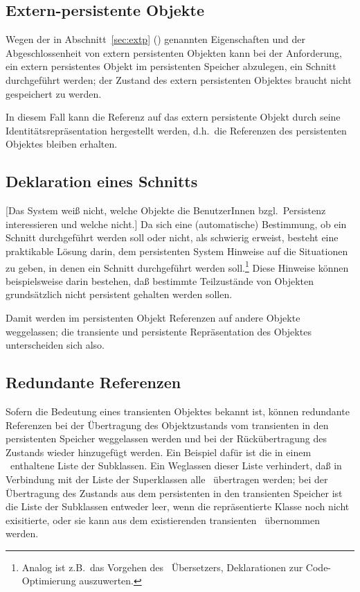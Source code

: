 \subsection{Extern-persistente Objekte}
%
Wegen der in Abschnitt~\ref{sec:extp} (\citepage{\pageref{sec:extp}})
genannten Eigenschaften und der Abgeschlossenheit von extern
persistenten Objekten kann bei der Anforderung, ein extern
persistentes Objekt im persistenten Speicher abzulegen, ein Schnitt
durchgef\"{u}hrt werden; der Zustand des extern persistenten Objektes
braucht nicht gespeichert zu werden.
%
\par{}In diesem Fall kann die Referenz auf das extern persistente
Objekt durch seine Iden\-ti\-t\"{a}ts\-re\-pr\"{a}\-sen\-ta\-tion
hergestellt werden, d.h.\ die Referenzen des persistenten Objektes
bleiben erhalten.
%
\subsection{Deklaration eines Schnitts}
%
%
[Das System wei\ss{} nicht, welche Objekte die BenutzerInnen
bzgl.\ Persistenz interessieren und welche nicht.]%
Da sich eine (automatische) Bestimmung, ob ein Schnitt
durchgef\"{u}hrt werden soll oder nicht, als schwierig erweist, besteht
eine praktikable L\"{o}sung darin, dem persistenten System Hinweise auf
die Situationen zu geben, in denen ein Schnitt durchgef\"{u}hrt werden
soll.\footnote{Analog ist z.B.\ das Vorgehen des \cl\ \"{U}bersetzers,
Deklarationen zur Code-Optimierung auszuwerten.} Diese Hinweise
k\"{o}nnen beispielsweise darin bestehen, da\ss{} bestimmte Teilzust\"{a}nde
von Objekten grunds\"{a}tzlich nicht persistent gehalten werden sollen.
%
\par{}Damit werden im persistenten Objekt Referenzen auf andere
Objekte weggelassen; die transiente und persistente Repr\"{a}sentation
des Objektes unterscheiden sich also.
%
\subsection{Redundante Referenzen}%
%
Sofern die Bedeutung eines transienten Objektes bekannt ist, k\"{o}nnen
redundante Referenzen bei der \"{U}bertragung des Objektzustands vom
transienten in den persistenten Speicher weggelassen werden und bei
der R\"{u}ck\"{u}bertragung des Zustands wieder hinzugef\"{u}gt werden. Ein
Beispiel daf\"{u}r ist die in einem \clsmo\ enthaltene Liste der
Subklassen. Ein Weglassen dieser Liste verhindert, da\ss{} in Verbindung
mit der Liste der Superklassen alle \clsmo[e]\ \"{u}bertragen werden; bei
der \"{U}bertragung des Zustands aus dem persistenten in den transienten
Speicher ist die Liste der Subklassen entweder leer, wenn die
repr\"{a}sentierte Klasse noch nicht exisitierte, oder sie kann aus dem
existierenden transienten \clsmo\ \"{u}bernommen werden.
%
